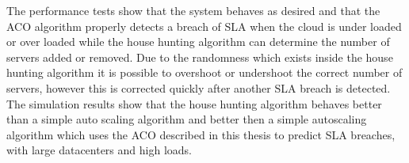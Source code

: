 The performance tests show that the system behaves as desired and that the ACO algorithm properly detects a breach of SLA when the cloud is under loaded or over loaded while the house hunting algorithm can determine the number of servers added or removed. Due to the randomness which exists inside the house hunting algorithm it is possible to overshoot or undershoot the correct number of servers, however this is corrected quickly after another SLA breach is detected. The simulation results show that the house hunting algorithm behaves better than a simple auto scaling algorithm and better then a simple autoscaling algorithm which uses the ACO described in this thesis to predict SLA breaches, with large datacenters and high loads.
